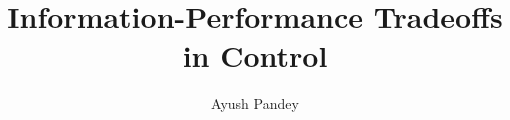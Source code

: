 \documentclass[12pt]{caltech_thesis_finalreport}
\begin{document}
\title{Information-Performance Tradeoffs in Control}
\author{Ayush Pandey}

\address{Pasadena, California}                     %
%


\maketitle[logo]

%

\end{document}
